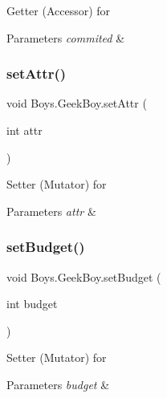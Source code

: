 Getter (Accessor) for 
\begin{DoxyParams}{Parameters}
{\em commited} & \\
\hline
\end{DoxyParams}
\mbox{\label{class_boys_1_1_geek_boy_a2dcd1f35854d1ebb3f469a1b611b0d15}} 
\subsubsection{\texorpdfstring{set\+Attr()}{setAttr()}}
{\footnotesize\ttfamily void Boys.\+Geek\+Boy.\+set\+Attr (\begin{DoxyParamCaption}\item[{int}]{attr }\end{DoxyParamCaption})\hspace{0.3cm}{\ttfamily [inline]}}

Setter (Mutator) for 
\begin{DoxyParams}{Parameters}
{\em attr} & \\
\hline
\end{DoxyParams}
\mbox{\label{class_boys_1_1_geek_boy_af04055d5235ee70a494fbe6d45b6bd6e}} 
\subsubsection{\texorpdfstring{set\+Budget()}{setBudget()}}
{\footnotesize\ttfamily void Boys.\+Geek\+Boy.\+set\+Budget (\begin{DoxyParamCaption}\item[{int}]{budget }\end{DoxyParamCaption})\hspace{0.3cm}{\ttfamily [inline]}}

Setter (Mutator) for 
\begin{DoxyParams}{Parameters}
{\em budget} & \\
\hline
\end{DoxyParams}
\mbox{\label{class_boys_1_1_geek_boy_a9a77de09bce8d3764673a37d6df7a5e6}} 
